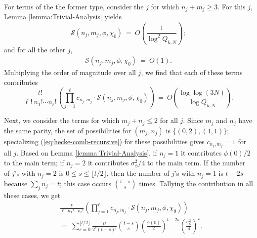 \documentclass[12pt, reqno,oneside]{amsart}
\theoremstyle{plain}
\theoremstyle{definition}
\theoremstyle{remark}
\theoremstyle{plain}
\numberwithin{equation}{section}
\begin{document}
For terms of the the former type, consider the $j$ for which $n_j+m_j\geq 3$. For this $j$, Lemma \ref{lemma:Trivial-Analysis} yields 
\begin{equation}
    \mathcal{S}(n_j,m_j,\phi,\chi_0) \ = \ O\left(\frac{1}{\log^2 Q_{k,N}}\right);
\end{equation}
and for all the other $j$, 
\begin{align}
\mathcal{S}(n_j,m_j,\phi,\chi_0) \ = \ O(1).
\end{align}
Multiplying the order of magnitude over all $j$, we find that each of these terms contributes
\begin{equation}\label{Trivial-Error}
\frac{t!}{\ell! \ n_1!\cdots n_\ell!}\left(\prod_{j=1}^\ell c_{n_j,m_j}\cdot \mathcal{S}(n_j,m_j,\phi,\chi_0)\right) \ = \ O\left(\frac{\log\log(3N)}{\log Q_{k,N}}\right).
\end{equation}

Next, we consider the terms for which $m_j+n_j\leq2$ for all $j$. Since $m_j$ and $n_j$ have the same parity, the set of possibilities for $(m_j,n_j)$ is $\{(0,2),(1,1)\}$; specializing (\ref{eq:hecke-comb-recursive}) for these possibilities gives $c_{n_j,m_j}=1$ for all $j$. Based on Lemma \ref{lemma:Trivial-Analysis}, if $n_j=1$ it contributes $\phi(0)/2$ to the main term; if $n_j=2$ it contributes $\sigma_\phi^2/4$ to the main term. If the number of $j$'s with $n_j=2$ is $0\leq s\leq\lfloor t/2\rfloor$, then the number of $j$'s with $n_j=1$ is $t-2s$ because $\sum_j n_j=t$; this case occurs $\binom{t-s}{s}$ times. Tallying the contribution in all these cases, we get 
\begin{align}\label{Trivial-Main}
\nonumber
&\frac{t!}{\ell! \ n_1!\cdots n_\ell!}\left(\prod_{j=1}^\ell c_{n_j,m_j}\cdot \mathcal{S}(n_j,m_j,\phi,\chi_0)\right) \\
& = \ \sum_{s=0}^{\lfloor t/2\rfloor}\frac{t!}{2^s(t-s)!}\binom{t-s}{s}\left(\frac{\phi(0)}{2}\right)^{t-2s}\left(\frac{\sigma_\phi^2}{4}\right)^{s}.
\end{align} 
\end{document}
